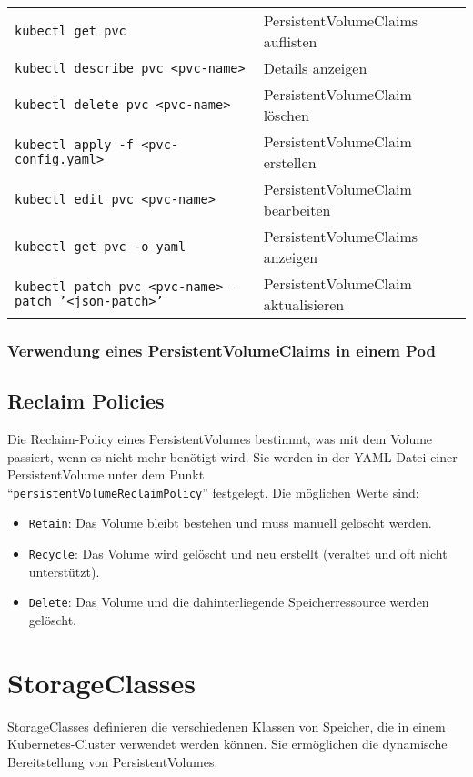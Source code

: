 \noindent
\begin{tabular}{|p{}|p{}|}
\hline
\texttt{kubectl get pvc} & PersistentVolumeClaims auflisten \\
\texttt{kubectl describe pvc <pvc-name>} & Details anzeigen \\
\texttt{kubectl delete pvc <pvc-name>} & PersistentVolumeClaim löschen \\
\texttt{kubectl apply -f <pvc-config.yaml>} & PersistentVolumeClaim erstellen \\
\texttt{kubectl edit pvc <pvc-name>} & PersistentVolumeClaim bearbeiten \\
\texttt{kubectl get pvc -o yaml} & PersistentVolumeClaims anzeigen \\
\texttt{kubectl patch pvc <pvc-name> --patch '<json-patch>'} & PersistentVolumeClaim aktualisieren \\
\hline
\end{tabular}
\newpage
\subsubsection{Verwendung eines PersistentVolumeClaims in einem Pod}


\subsection{Reclaim Policies}
Die Reclaim-Policy eines PersistentVolumes bestimmt, was mit dem Volume passiert, wenn es nicht mehr benötigt wird. Sie werden in der YAML-Datei einer PersistentVolume unter dem Punkt\\ \enquote{\texttt{persistentVolumeReclaimPolicy}} festgelegt. Die möglichen Werte sind:

\begin{itemize}
    \item \texttt{Retain}: Das Volume bleibt bestehen und muss manuell gelöscht werden.
    \item \texttt{Recycle}: Das Volume wird gelöscht und neu erstellt (veraltet und oft nicht unterstützt).
    \item \texttt{Delete}: Das Volume und die dahinterliegende Speicherressource werden gelöscht.
\end{itemize}
\section{StorageClasses}
StorageClasses definieren die verschiedenen Klassen von Speicher, die in einem Kubernetes-Cluster verwendet werden können. Sie ermöglichen die dynamische Bereitstellung von PersistentVolumes. \\
